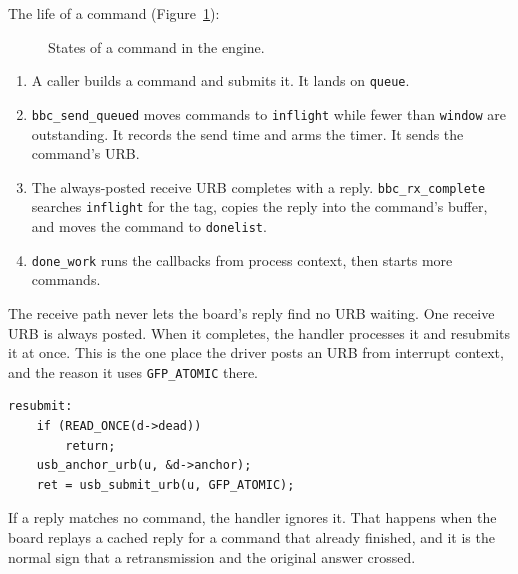 \documentclass[11pt,a4paper,oneside]{report}
\newcommand{\code}[1]{\texttt{\small #1}}
\begin{document}
The life of a command (Figure~\ref{fig:cmd}):

\begin{figure}[ht]
\centering
{}
\caption{States of a command in the engine.}\label{fig:cmd}
\end{figure}

\begin{enumerate}
  \item A caller builds a command and submits it. It lands on \code{queue}.
  \item \code{bbc\_send\_queued} moves commands to \code{inflight} while fewer than \code{window} are outstanding. It records the send time and arms the timer. It sends the command's URB.
  \item The always-posted receive URB completes with a reply. \code{bbc\_rx\_complete} searches \code{inflight} for the tag, copies the reply into the command's buffer, and moves the command to \code{donelist}.
  \item \code{done\_work} runs the callbacks from process context, then starts more commands.
\end{enumerate}

The receive path never lets the board's reply find no URB waiting. One receive URB is always posted. When it completes, the handler processes it and resubmits it at once. This is the one place the driver posts an URB from interrupt context, and the reason it uses \code{GFP\_ATOMIC} there.

\begin{lstlisting}
resubmit:
	if (READ_ONCE(d->dead))
		return;
	usb_anchor_urb(u, &d->anchor);
	ret = usb_submit_urb(u, GFP_ATOMIC);
\end{lstlisting}

If a reply matches no command, the handler ignores it. That happens when the board replays a cached reply for a command that already finished, and it is the normal sign that a retransmission and the original answer crossed.
\end{document}
